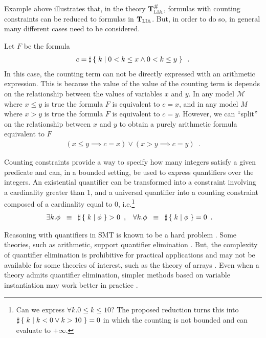 Example above illustrates that, in the theory $\operatorname{\mathbf{T}^\#_\mathbb{LIA}}$, formulas with
counting constraints can be reduced to formulas in $\operatorname{\mathbf{T}_\mathbb{LIA}}$. But, in
order to do so, in general many different cases need to be considered.

\begin{example}
Let  $F$ be the formula
\begin{align*}
  c = \sharp\left\lbrace\;k\;|\;0 < k \le x \land 0 < k \le y\;\right\rbrace\enspace.
\end{align*}
In this case, the counting term can not be directly expressed with an
arithmetic expression. This is because the value of the value of the
counting term is depends on the relationship between the values of
variables $x$ and $y$. In any model $\mathcal{M}$ where $x \le y$ is
true the formula $F$ is equivalent to $c = x$, and in any model $M$
where $x > y$ is true the formula $F$ is equivalent to $c = y$.
However, we can ``split'' on the relationship between $x$ and $y$ to
obtain a purely arithmetic formula equivalent to $F$
\begin{align*}
  (x \le y \implies c = x) \lor (x > y \implies c = y)\enspace.
\end{align*}
\end{example}

Counting constraints provide a way to specify how many integers
satisfy a given predicate and can, in a bounded setting, be used to
express quantifiers over the integers. An existential quantifier can
be transformed into a constraint involving a cardinality greater than
1, and a universal quantifier into a counting constraint composed of a
cardinality equal to 0, i.e.\footnote{Can we express $\forall k . 0 \le k \le 10$? The
proposed reduction turns this into $\sharp\left\lbrace\;k\;|\;k < 0 \lor k > 10\;\right\rbrace = 0$
in which the counting is not bounded and can evaluate to $+\infty$.}
\begin{align*}
  \exists k . \phi &\;\;\equiv\;\; \sharp\left\lbrace\;k\;|\;\phi\;\right\rbrace > 0 \enspace, &
  \forall k . \phi &\;\;\equiv\;\; \sharp\left\lbrace\;k\;|\;\phi\;\right\rbrace = 0 \enspace.
\end{align*}

Reasoning with quantifiers in SMT is known to be a hard problem
\cite{arithquantifiers}. Some theories, such as arithmetic, support
quantifier elimination \cite{cooper}. But, the complexity of
quantifier elimination is prohibitive for practical applications and
may not be available for some theories of interest, such as the theory of
arrays \cite{bradley2006s}. Even when a theory admits quantifier
elimination,  simpler methods based on variable instantiation may work
better in practice \cite{dutertre2015solving}.

